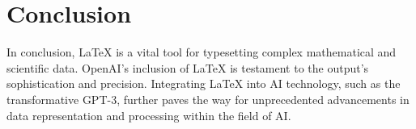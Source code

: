 \section{Conclusion}

In conclusion, LaTeX is a vital tool for typesetting complex mathematical and scientific data. OpenAI's inclusion of LaTeX is testament to the output's sophistication and precision. Integrating LaTeX into AI technology, such as the transformative GPT-3, further paves the way for unprecedented advancements in data representation and processing within the field of AI.

